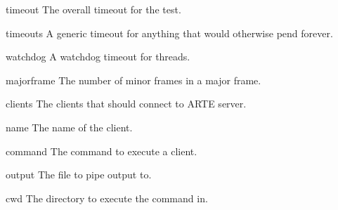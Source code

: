 \begin{DoxyItemize}
\item timeout The overall timeout for the test.
\item timeouts A generic timeout for anything that would otherwise pend forever.
\item watchdog A watchdog timeout for threads.
\item majorframe The number of minor frames in a major frame.
\item clients The clients that should connect to A\+R\+TE server.
\begin{DoxyItemize}
\item name The name of the client.
\item command The command to execute a client.
\item output The file to pipe output to.
\item cwd The directory to execute the command in. 
\end{DoxyItemize}
\end{DoxyItemize}